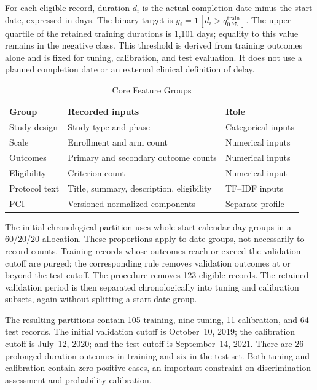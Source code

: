 \documentclass[10pt,letterpaper,twocolumn]{article}
\begin{document}
For each eligible record, duration $d_i$ is the actual completion date minus the start date, expressed in days. The binary target is $y_i=\mathbf{1}[d_i>q_{0.75}^{\mathrm{train}}]$. The upper quartile of the retained training durations is 1,101 days; equality to this value remains in the negative class. This threshold is derived from training outcomes alone and is fixed for tuning, calibration, and test evaluation. It does not use a planned completion date or an external clinical definition of delay.

\begin{table}[!t]
\caption{Core Feature Groups}
\label{tab:features}
\centering
\footnotesize
\setlength{\tabcolsep}{3pt}
\renewcommand{\arraystretch}{1.25}
\begin{tabular}{|p{}|p{}|p{}|}
\hline
\textbf{Group} & \textbf{Recorded inputs} & \textbf{Role} \\
\hline
Study design & Study type and phase & Categorical inputs \\
\hline
Scale & Enrollment and arm count & Numerical inputs \\
\hline
Outcomes & Primary and secondary outcome counts & Numerical inputs \\
\hline
Eligibility & Criterion count & Numerical input \\
\hline
Protocol text & Title, summary, description, eligibility & TF--IDF inputs \\
\hline
PCI & Versioned normalized components & Separate profile \\
\hline
\end{tabular}
\end{table}

The initial chronological partition uses whole start-calendar-day groups in a 60/20/20 allocation. These proportions apply to date groups, not necessarily to record counts. Training records whose outcomes reach or exceed the validation cutoff are purged; the corresponding rule removes validation outcomes at or beyond the test cutoff. The procedure removes 123 eligible records. The retained validation period is then separated chronologically into tuning and calibration subsets, again without splitting a start-date group.

The resulting partitions contain 105 training, nine tuning, 11 calibration, and 64 test records. The initial validation cutoff is October~10, 2019; the calibration cutoff is July~12, 2020; and the test cutoff is September~14, 2021. There are 26 prolonged-duration outcomes in training and six in the test set. Both tuning and calibration contain zero positive cases, an important constraint on discrimination assessment and probability calibration.
\end{document}

